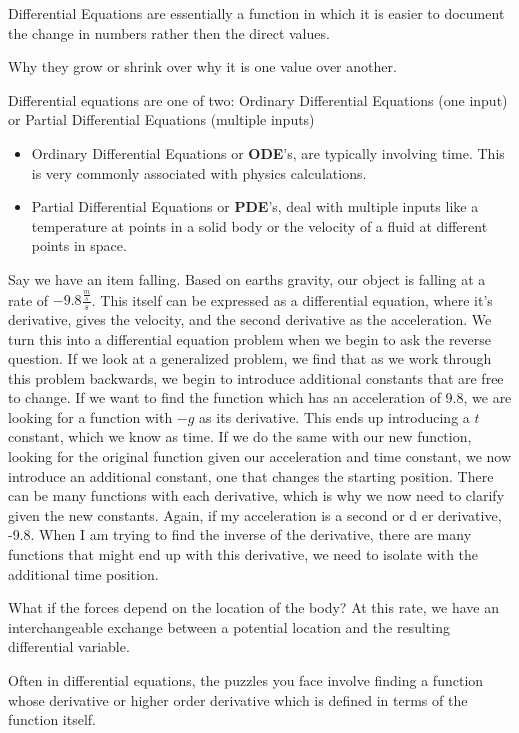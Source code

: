 \documentclass[10pt, oneside]{report}
\begin{document}
Differential Equations are essentially a function in which it is easier to document the change in numbers rather then the direct values.  

Why they grow or shrink over why it is one value over another.

Differential equations are one of two:
Ordinary Differential Equations (one input) or Partial Differential Equations (multiple inputs)
\begin{itemize}
    \item Ordinary Differential Equations or \textbf{ODE}'s, are typically involving time.  This is very commonly associated with physics calculations.  
    \item Partial Differential Equations or \textbf{PDE}'s, deal with multiple inputs like a temperature at points in a solid body or the velocity of a fluid at different points in space. 
\end{itemize}
Say we have an item falling.  Based on earths gravity, our object is falling at a rate of $-9.8 \frac{\frac{m}{s}}{s}$.  This itself can be expressed as a differential equation, where it's derivative, gives the velocity, and the second derivative as the acceleration.  
We turn this into a differential equation problem when we begin to ask the reverse question.  If we look at a generalized problem, we find that as we work through this problem backwards, we begin to introduce additional constants that are free to change.  If we want to find the function which has an acceleration of 9.8, we are looking for a function with $-g$ as its derivative.  This ends up introducing a $t$ constant, which we know as time.  If we do the same with our new function, looking for the original function given our acceleration and time constant, we now introduce an additional constant, one that changes the starting position. 
There can be many functions with each derivative, which is why we now need to clarify given the new constants.  
Again, if my acceleration is a second or d er derivative, -9.8.  When I am trying to find the inverse of the derivative, there are many functions that might end up with this derivative, we need to isolate with the additional time position. 

What if the forces depend on the location of the body? At this rate, we have an interchangeable exchange between a potential location and the resulting differential variable.  

Often in differential equations, the puzzles you face involve finding a function whose derivative or higher order derivative which is defined in terms of the function itself. 
\end{document}
